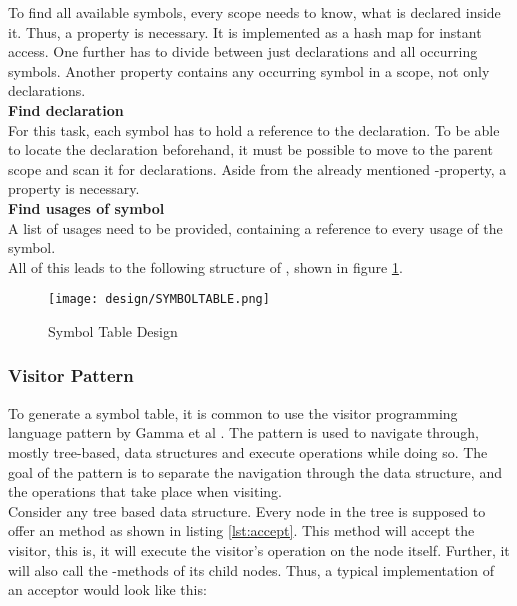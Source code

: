 To find all available symbols, every scope needs to know, what is declared inside it.
Thus, a property  is necessary.
It is implemented as a hash map for instant access.
One further has to divide between just declarations and all occurring symbols.
Another property  contains any occurring symbol in a scope, not only declarations.\\

\textbf{Find declaration}\\
For this task, each symbol has to hold a reference to the declaration.
To be able to locate the declaration beforehand, it must be possible to move to the parent scope and scan it for declarations.
Aside from the already mentioned -property, a   property is necessary. \\

\textbf{Find usages of symbol}\\
A list of usages need to be provided, containing a reference to every usage of the symbol. \\

All of this leads to the following structure of , shown in figure \ref{fig:symboltabledesign}.

\begin{figure}[H]
    \centering
    \texttt{[image: design/SYMBOLTABLE.png]}
    \caption{Symbol Table Design}
    \label{fig:symboltabledesign}
\end{figure}

\subsubsection{Visitor Pattern}
To generate a symbol table, it is common to use the visitor programming language pattern by Gamma et al \cite{gofBook}. 
The pattern is used to navigate through, mostly tree-based, data structures and execute operations while doing so.
The goal of the pattern is to separate the navigation through the data structure, and the operations that take place when visiting.\\

Consider any tree based data structure.
Every node in the tree is supposed to offer an  method as shown in listing \ref{lst:accept}.
This method will accept the visitor, this is, it will execute the visitor's operation on the node itself.
Further, it will also call the -methods of its child nodes.
Thus, a typical implementation of an acceptor would look like this:

